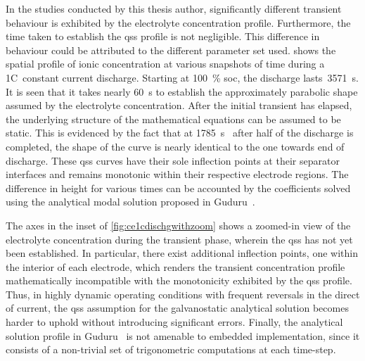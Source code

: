 In  the  studies  conducted  by  this  thesis  author,  significantly  different
transient  behaviour  is exhibited  by  the  electrolyte concentration  profile.
Furthermore,  the  time  taken  to   establish  the  \gls{qss}  profile  is  not
negligible. This  difference in behaviour  could be attributed to  the different
parameter  set used.    shows  the spatial  profile
of  ionic  concentration at  various  snapshots  of  time during  a  1C~constant
current  discharge.  Starting  at \SI{100}{\percent}  \gls{soc},  the  discharge
lasts~\SI{3571}{\second}.  It  is seen  that  it  takes nearly  \SI{60}{\second}
to  establish  the approximately  parabolic  shape  assumed by  the  electrolyte
concentration. After the initial transient has elapsed, the underlying structure
of the mathematical equations can be assumed  to be static. This is evidenced by
the  fact  that  at  \SI{1785}{\second}  \ie~after  half  of  the  discharge  is
completed, the shape of the curve is  nearly identical to the one towards end of
discharge. These  \gls{qss} curves  have their sole  inflection points  at their
separator  interfaces and  remains monotonic  within their  respective electrode
regions.  The  difference in  height  for  various  times  can be  accounted  by
the  coefficients  solved  using  the  analytical  modal  solution  proposed  in
Guduru~\etal{}.

The  axes  in  the  inset  of \cref{fig:ce1cdischgwithzoom}  shows  a  zoomed-in
view  of  the electrolyte  concentration  during  the transient  phase,  wherein
the  \gls{qss}  has  not  yet  been  established.  In  particular,  there  exist
additional inflection points,  one within the interior of  each electrode, which
renders the transient concentration profile mathematically incompatible with the
monotonicity  exhibited  by  the  \gls{qss} profile.  Thus,  in  highly  dynamic
operating  conditions with  frequent reversals  in  the direct  of current,  the
\gls{qss} assumption for the galvanostatic analytical solution becomes harder to
uphold without introducing significant  errors. Finally, the analytical solution
profile in Guduru~\etal{}  is not amenable to embedded  implementation, since it
consists of a non-trivial set of trigonometric computations at each time-step.

